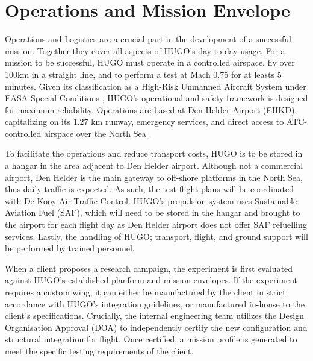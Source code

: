 \section*{Operations and Mission Envelope}
\label{sec:exec-operations_and_mission}

Operations and Logistics are a crucial part in the development of a successful mission. Together they cover all aspects of HUGO's day-to-day usage. For a mission to be successful, HUGO must operate in a controlled airspace, fly over 100km in a straight line, and to perform a test at Mach 0.75 for at leasts 5 minutes. Given its classification as a High-Risk Unmanned Aircraft System under EASA Special Conditions \cite{easa_light_uas_crd_is3}, HUGO's operational and safety framework is designed for maximum reliability. Operations are based at Den Helder Airport (EHKD), capitalizing on its 1.27 km runway, emergency services, and direct access to ATC-controlled airspace over the North Sea \cite{DenHelderAirport2013DHANieuwsbrief}.

To facilitate the operations and reduce transport costs, HUGO is to be stored in a hangar in the area adjacent to Den Helder airport. Although not a commercial airport, Den Helder is the main gateway to off-shore platforms in the North Sea, thus daily traffic is expected. As such, the test flight plans will be coordinated with De Kooy Air Traffic Control. HUGO's propulsion system uses Sustainable Aviation Fuel (SAF), which will need to be stored in the hangar and brought to the airport for each flight day as Den Helder airport does not offer SAF refuelling services. Lastly, the handling of HUGO; transport, flight, and ground support will be performed by trained personnel.

When a client proposes a research campaign, the experiment is first evaluated against HUGO's established planform and mission envelopes. If the experiment requires a custom wing, it can either be manufactured by the client in strict accordance with HUGO's integration guidelines, or manufactured in-house to the client's specifications. Crucially, the internal engineering team utilizes the Design Organisation Approval (DOA) to independently certify the new configuration and structural integration for flight. Once certified, a mission profile is generated to meet the specific testing requirements of the client. 

